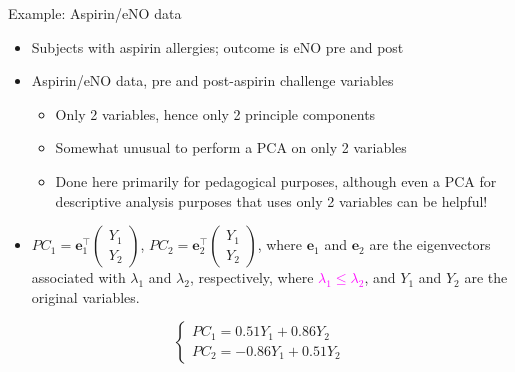 \documentclass[
  9pt,
  ignorenonframetext,
]{beamer}
\providecommand{\tightlist}{%
  \setlength{\itemsep}{0pt}\setlength{\parskip}{0pt}}
\begin{document}
\begin{frame}{Example: Aspirin/eNO data}
\protect\hypertarget{example-aspirineno-data}{}
\begin{itemize}
\tightlist
\item
  Subjects with aspirin allergies; outcome is eNO pre and post
\item
  Aspirin/eNO data, pre and post-aspirin challenge variables

  \begin{itemize}
  \tightlist
  \item
    Only 2 variables, hence only 2 principle components
  \item
    Somewhat unusual to perform a PCA on only 2 variables
  \item
    Done here primarily for pedagogical purposes, although even a PCA
    for descriptive analysis purposes that uses only 2 variables can be
    helpful!
  \end{itemize}
\item
  \(PC_1 = \pmb e_1^{\top} \begin{pmatrix} Y_1\\ Y_2 \end{pmatrix}\),
  \(PC_2 = \pmb e_2^{\top} \begin{pmatrix} Y_1\\ Y_2 \end{pmatrix}\),
  where \(\pmb e_1\) and \(\pmb e_2\) are the eigenvectors associated
  with \(\lambda_1\) and \(\lambda_2\), respectively, where
  \textcolor{magenta}{$\lambda_1 \leq \lambda_2$}, and \(Y_1\) and
  \(Y_2\) are the original variables.
\end{itemize}

\[
\begin{cases}
PC_1 = 0.51 Y_1 + 0.86 Y_2 \\
PC_2 = -0.86 Y_1 + 0.51 Y_2
\end{cases}
\]
\end{frame}
\end{document}
